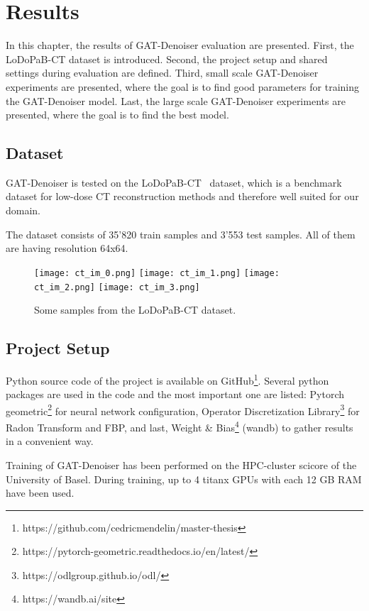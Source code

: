 \chapter{Results}
\label{sec:results}

In this chapter, the results of GAT-Denoiser evaluation are presented.
First, the LoDoPaB-CT dataset is introduced.
Second, the project setup and shared settings during evaluation are defined.
Third, small scale GAT-Denoiser experiments are presented, where the goal is to find
good parameters for training the GAT-Denoiser model. 
Last, the large scale GAT-Denoiser experiments are presented, where the goal is 
to find the best model.



\section{Dataset}
GAT-Denoiser is tested on the LoDoPaB-CT~\cite{lodopab-dataset} dataset, which is a 
benchmark dataset for low-dose CT reconstruction methods and therefore well suited for our domain.

The dataset consists of 35'820 train samples and 3'553 test samples.
All of them are having resolution 64x64.

\begin{figure}[H]
  \centering
  \hfill
  \texttt{[image: ct\_im\_0.png]}
  \hfill
  \texttt{[image: ct\_im\_1.png]}
  \hfill
  \texttt{[image: ct\_im\_2.png]}
  \hfill
  \texttt{[image: ct\_im\_3.png]}
  \hfill
  \caption{Some samples from the LoDoPaB-CT dataset.}
\end{figure}



\section{Project Setup}
Python source code of the project is available on GitHub\footnote{https://github.com/cedricmendelin/master-thesis}.
Several python packages are used in the code and the most important one are listed: Pytorch geometric\footnote{https://pytorch-geometric.readthedocs.io/en/latest/} 
for neural network configuration, Operator Discretization Library\footnote{https://odlgroup.github.io/odl/} for Radon Transform and FBP, 
and last, Weight \& Bias\footnote{https://wandb.ai/site} (wandb) to gather results in a convenient way.

Training of GAT-Denoiser has been performed on the HPC-cluster scicore of the University of Basel.
During training, up to 4 titanx GPUs with each 12 GB RAM have been used.


